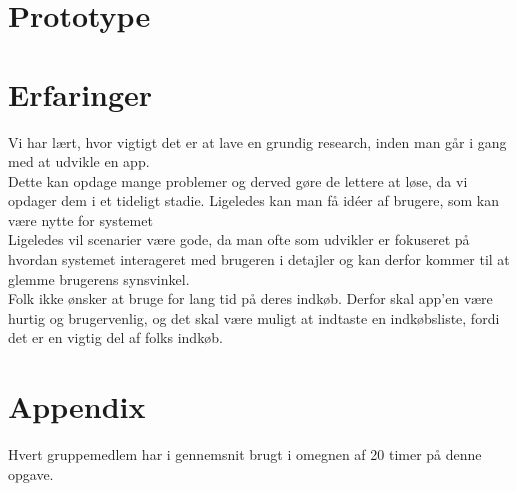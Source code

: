 \documentclass[12pt]{article}
\begin{document}
\section{Prototype}
\newpage

\section{Erfaringer}
Vi har lært, hvor vigtigt det er at lave en grundig research, inden man går i gang med at udvikle en app.\\ 
Dette kan opdage mange problemer og derved gøre de lettere at løse, da vi opdager dem i et tideligt stadie. Ligeledes kan man få idéer af brugere, som kan være nytte for systemet
\\
Ligeledes vil scenarier være gode, da man ofte som udvikler er fokuseret på hvordan systemet interageret med brugeren i detajler og kan derfor kommer til at glemme brugerens synsvinkel. \\
Folk ikke ønsker at bruge for lang tid på deres indkøb. Derfor skal app'en være hurtig og brugervenlig, og det skal være muligt at indtaste en indkøbsliste, fordi det er en vigtig del af folks indkøb.
\section{Appendix}
Hvert gruppemedlem har i gennemsnit brugt i omegnen af 20 timer på denne opgave.
\end{document}

